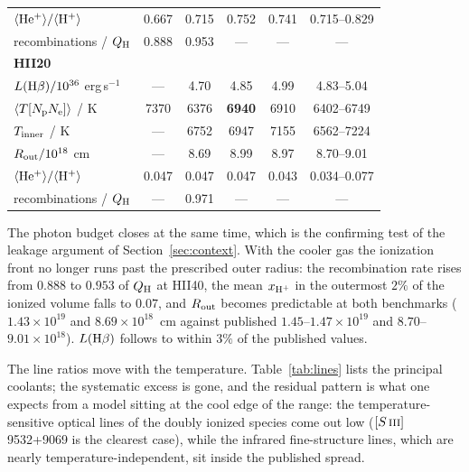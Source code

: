 \documentclass[english,a4paper]{my_memo}
\newcommand{\SIII}{S\,\textsc{iii}}
\begin{document}
\begin{table}[htbp]
\begin{tabular}{lccccc}
$\langle {\rm He^+}\rangle/\langle {\rm H^+}\rangle$ & 0.667 & 0.715 & 0.752 & 0.741 & 0.715--0.829 \\
recombinations / $Q_{\rm H}$            & 0.888 & 0.953 & --- & --- & --- \\
\midrule
\multicolumn{6}{l}{\textbf{HII20}} \\
$L({\rm H}\beta)/10^{36}$ erg\,s$^{-1}$ & --- & 4.70 & 4.85 & 4.99 & 4.83--5.04 \\
$\langle T[N_{\rm p}N_{\rm e}]\rangle$ / K & 7370 & 6376 & \textbf{6940} & 6910 & 6402--6749 \\
$T_{\rm inner}$ / K                     & --- & 6752 & 6947 & 7155 & 6562--7224 \\
$R_{\rm out}/10^{18}$ cm                & --- & 8.69 & 8.99 & 8.97 & 8.70--9.01 \\
$\langle {\rm He^+}\rangle/\langle {\rm H^+}\rangle$ & 0.047 & 0.047 & 0.047 & 0.043 & 0.034--0.077 \\
recombinations / $Q_{\rm H}$            & --- & 0.971 & --- & --- & --- \\
\bottomrule
\end{tabular}
\end{table}

The photon budget closes at the same time, which is the confirming test of the
leakage argument of Section~\ref{sec:context}.  With the cooler gas the
ionization front no longer runs past the prescribed outer radius: the
recombination rate rises from $0.888$ to $0.953$ of $Q_{\rm H}$ at HII40, the
mean $x_{\rm H^+}$ in the outermost $2\%$ of the ionized volume falls to
$0.07$, and $R_{\rm out}$ becomes predictable at both benchmarks
($1.43\times10^{19}$ and $8.69\times10^{18}$~cm against published $1.45$--$1.47
\times10^{19}$ and $8.70$--$9.01\times10^{18}$).  $L({\rm H}\beta)$ follows to
within $3\%$ of the published values.

The line ratios move with the temperature.  Table~\ref{tab:lines} lists the
principal coolants; the systematic excess is gone, and the residual pattern is
what one expects from a model sitting at the cool edge of the range: the
temperature-sensitive optical lines of the doubly ionized species come out low
($[\SIII{}]$ 9532+9069 is the clearest case), while the infrared
fine-structure lines, which are nearly temperature-independent, sit inside the
published spread.
\end{document}
